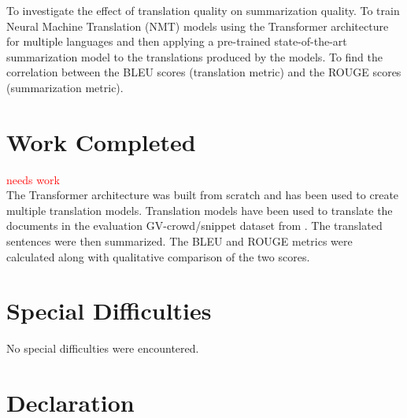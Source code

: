 \documentclass[12pt,a4paper,twoside,openright]{report}
\newcommand{\red}[1]{\textcolor{red}{#1}}
\begin{document}
To investigate the effect of translation quality on summarization quality. To train Neural Machine Translation (NMT) models using the Transformer architecture for multiple languages and then applying a pre-trained state-of-the-art summarization model to the translations produced by the models. To find the correlation between the BLEU scores (translation metric) and the ROUGE scores (summarization metric). 




\section*{Work Completed}
\red{needs work}\\
The Transformer architecture was built from scratch and has been used to create multiple translation models. Translation models have been used to translate the documents in the evaluation GV-crowd/snippet dataset from \cite{nguyen-daume-iii-2019-global}. The translated sentences were then summarized. The BLEU and ROUGE metrics were calculated along with qualitative comparison of the two scores.

\section*{Special Difficulties}
No special difficulties were encountered. 


 
\newpage
\section*{Declaration}
\end{document}
